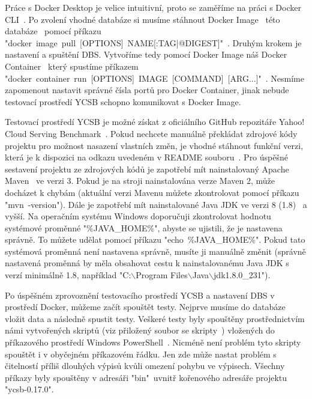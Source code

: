 \documentclass[czech,master,dept460,male,csharp,cpdeclaration]{diploma}
\begin{document}
	Práce s Docker Desktop je velice intuitivní, proto se zaměříme na práci s Docker CLI~\cite{docker-cli}. Po zvolení vhodné databáze si musíme stáhnout Docker Image~\cite{docker-image-container} této databáze~\cite{docker-hub} pomocí příkazu "docker~image~pull~[OPTIONS]~NAME[:TAG|@DIGEST]"~\cite{docker-image-pull}. Druhým krokem je nastavení a spuštění DBS. Vytvoříme tedy pomocí Docker Image náš Docker Container~\cite{docker-image-container} který spustíme příkazem "docker~container~run~[OPTIONS]~IMAGE~[COMMAND]~[ARG...]"~\cite{docker-container-run}. Nesmíme zapomenout nastavit správné čísla portů pro Docker Container, jinak nebude testovací prostředí YCSB schopno komunikovat s Docker Image. 
	
	Testovací prostředí YCSB je možné získat z oficiálního GitHub repozitáře Yahoo! Cloud Serving Benchmark~\cite{ycsb}. Pokud nechcete manuálně překládat zdrojové kódy projektu pro možnost nasazení vlastních změn, je vhodné stáhnout funkční verzi, která je k dispozici na odkazu uvedeném v README souboru~\cite{ycsb-download}. Pro úspěšné sestavení projektu ze zdrojových kódů je zapotřebí mít nainstalovaný Apache Maven~\cite{maven} ve verzi 3. Pokud je na stroji nainstalována verze Maven 2, může docházet k chybám (aktuální verzi Mavenu můžete zkontrolovat pomocí příkazu "mvn~-version"). Dále je zapotřebí mít nainstalované Java JDK ve verzi 8 (1.8)~\cite{java-jdk} a vyšší. Na operačním systému Windows doporučuji zkontrolovat hodnotu systémové proměnné "\%JAVA\_HOME\%", abyste se ujistili, že je nastavena správně. To můžete udělat pomocí příkazu "echo~\%JAVA\_HOME\%". Pokud tato systémová proměnná není nastavena správně, musíte ji manuálně změnit (správně nastavená proměnná by měla obsahovat cestu k nainstalovanému Java JDK s verzí minimálně 1.8, například  "C:$\backslash$Program Files$\backslash$Java$\backslash$jdk1.8.0\_231").
	
	Po úspěšném zprovoznění testovacího prostředí YCSB a nastavení DBS v prostředí Docker, můžeme začít spouštět testy. Nejprve musíme do databáze vložit data a následně spustit testy. Veškeré testy byly spouštěny prostřednictvím námi vytvořených skriptů (viz přiložený soubor se skripty~\cite{skripty-soubor}) vložených do příkazového prostředí Windows PowerShell~\cite{win-powershell}. Nicméně není problém tyto skripty spouštět i v obyčejném příkazovém řádku. Jen zde může nastat problém s čitelností příliš dlouhých výpisů kvůli omezení pohybu ve výpisech. Všechny příkazy byly spouštěny v adresáři "bin"~uvnitř kořenového adresáře projektu "ycsb-0.17.0".
	
\end{document}
